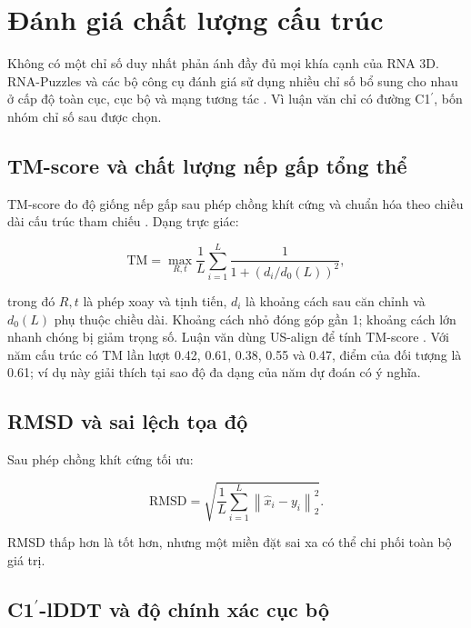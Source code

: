 \documentclass[12pt,a4paper,oneside]{report}
\newcommand{\cprime}{C1$^{\prime}$}
\begin{document}
\section{Đánh giá chất lượng cấu trúc}

Không có một chỉ số duy nhất phản ánh đầy đủ mọi khía cạnh của RNA 3D. RNA-Puzzles và
các bộ công cụ đánh giá sử dụng nhiều chỉ số bổ sung cho nhau ở cấp độ toàn cục, cục bộ
và mạng tương tác \cite{rna_puzzles,rna_puzzles_toolkit,rnassess}. Vì luận văn chỉ có
đường \cprime{}, bốn nhóm chỉ số sau được chọn.

\subsection{TM-score và chất lượng nếp gấp tổng thể}

TM-score đo độ giống nếp gấp sau phép chồng khít cứng và chuẩn hóa theo chiều dài cấu
trúc tham chiếu \cite{tm_score}. Dạng trực giác:

\begin{equation}
\mathrm{TM} = \max_{R,t}\frac{1}{L}
\sum_{i=1}^{L}\frac{1}{1+(d_i/d_0(L))^2},
\end{equation}

trong đó $R,t$ là phép xoay và tịnh tiến, $d_i$ là khoảng cách sau căn chỉnh và $d_0(L)$
phụ thuộc chiều dài. Khoảng cách nhỏ đóng góp gần 1; khoảng cách lớn nhanh chóng bị giảm
trọng số. Luận văn dùng US-align để tính TM-score \cite{usalign}. Với năm cấu trúc có
TM lần lượt 0.42, 0.61, 0.38, 0.55 và 0.47, điểm của đối tượng là 0.61; ví dụ này giải
thích tại sao độ đa dạng của năm dự đoán có ý nghĩa.

\subsection{RMSD và sai lệch tọa độ}

Sau phép chồng khít cứng tối ưu:

\begin{equation}
\mathrm{RMSD}=\sqrt{\frac{1}{L}\sum_{i=1}^{L}
\left\|\hat{x}_i-y_i\right\|_2^2}.
\end{equation}

RMSD thấp hơn là tốt hơn, nhưng một miền đặt sai xa có thể chi phối toàn bộ giá trị.

\subsection{\texorpdfstring{\cprime{}-lDDT}{C1-prime-lDDT} và độ chính xác cục bộ}
\end{document}
